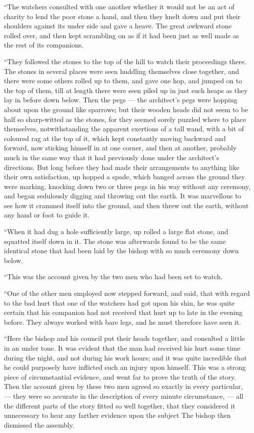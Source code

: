 \documentclass[
  12pt,
  a5paper,
  twoside]{book}
\begin{document}
``The watchers consulted with one another whether it would not be an act
of charity to lend the poor stone a hand, and then they knelt down and
put their shoulders against its under side and gave a heave. The great
awkward stone rolled over, and then kept scrambling on as if it had been
just as well made as the rest of its companions.

``They followed the stones to the top of the hill to watch their
proceedings there. The stones in several places were seen huddling
themselves close together, and there were some others rolled up to them,
and gave one hop, and jumped on to the top of them, till at length there
were seen piled up in just such heaps as they lay in before down below.
Then the pegs --- the architect's pegs were hopping about upon the
ground like sparrows; but their wooden heads did not seem to be half so
sharp-witted as the stones, for they seemed sorely puzzled where to
place themselves, notwithstanding the apparent exertions of a tall wand,
with a bit of coloured rag at the top of it, which kept constantly
moving backward and forward, now sticking himself in at one corner, and
then at another, probably much in the same way that it had previously
done under the architect's directions. But long before they had made
their arrangements to anything like their own satisfaction, up hopped a
spade, which banged across the ground they were marking, knocking down
two or three pegs in his way without any ceremony, and began sedulously
digging and throwing out the earth. It was marvellous to see how it
crammed itself into the ground, and then threw out the earth, without
any hand or foot to guide it.

``When it had dug a hole sufficiently large, up rolled a large flat
stone, and squatted itself down in it. The stone was afterwards found to
be the same identical stone that had been laid by the bishop with so
much ceremony down below.

``This was the account given by the two men who had been set to watch.

``One of the other men employed now stepped forward, and said, that with
regard to the bad hurt that one of the watchers had got upon his shin,
he was quite certain that his companion had not received that hurt up to
late in the evening before. They always worked with bare legs, and he
must therefore have seen it.

``Here the bishop and his council put their heads together, and
consulted a little in an under tone. It was evident that the man had
received his hurt some time during the night, and not during his work
hours; and it was quite incredible that he could purposely have
inflicted such an injury upon himself. This was a strong piece of
circumstantial evidence, and went far to prove the truth of the story.
Then the account given by these two men agreed so exactly in every
particular, --- they were so accurate in the description of every minute
circumstance, --- all the different parts of the story fitted so well
together, that they considered it unnecessary to hear any farther
evidence upon the subject The bishop then dismissed the assembly.
\end{document}
